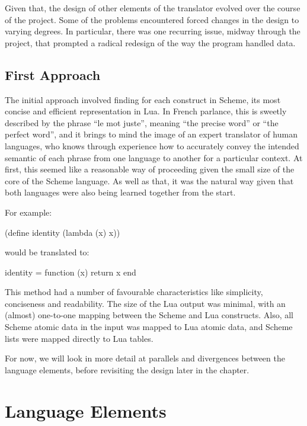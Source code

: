 Given that, the design of other elements of the translator evolved over the
course of the project. Some of the problems encountered forced changes in the
design to varying degrees. In particular, there was one recurring issue, midway
through the project, that prompted a radical redesign of the way the program
handled data.

\subsection{First Approach}

The initial approach involved finding for each construct in Scheme, its most
concise and efficient representation in Lua. In French parlance, this is sweetly
described by the phrase ``le mot juste'', meaning ``the precise word'' or ``the
perfect word'', and it brings to mind the image of an expert translator of
human languages, who knows through experience how to accurately convey the
intended semantic of each phrase from one language to another for a particular
context. At first, this seemed like a reasonable way of proceeding given the
small size of the core of the Scheme language. As well as that, it was the
natural way given that both languages were also being learned together from the
start.

\begin{framed}
For example:
\begin{center}\ttfamily (define identity (lambda (x) x))\end{center}

would be translated to:
\begin{center}\ttfamily identity = function (x) return x end\end{center}
\end{framed}

This method had a number of favourable characteristics like simplicity,
conciseness and readability. The size of the Lua output was minimal, with an
(almost) one-to-one mapping between the Scheme and Lua constructs. Also, all
Scheme atomic data in the input was mapped to Lua atomic data, and Scheme lists
were mapped directly to Lua tables.

For now, we will look in more detail at parallels and divergences between the
language elements, before revisiting the design later in the chapter.


\section{Language Elements}


